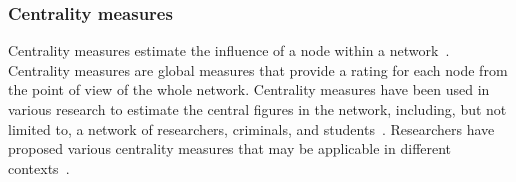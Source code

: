 \documentclass[10pt,journal,compsoc]{IEEEtran}
\begin{document}
\subsubsection{Centrality measures} Centrality measures estimate the influence of a node within a network~\cite{das2018study}. Centrality measures are global measures that provide a rating for each node from the point of view of the whole network. Centrality measures have been used in various research to estimate the central figures in the network, including, but not limited to, a network of researchers, criminals, and students~\cite{das2018study}. Researchers have proposed various centrality measures that may be applicable in different contexts~\cite{das2018study}.



\end{document}
